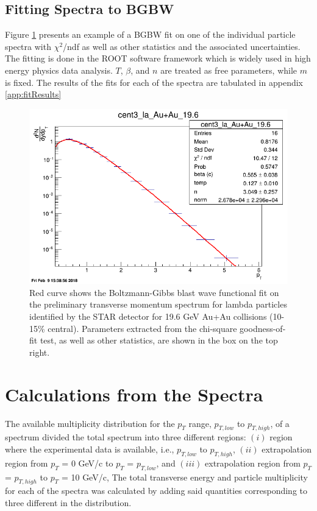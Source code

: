 \subsection{Fitting Spectra to BGBW}
Figure \ref{fig:fit} presents an example of a BGBW fit on one of the individual particle spectra with $\chi^{2}$/ndf as well as other statistics and the associated uncertainties. The fitting is done in the ROOT software framework which is widely used in high energy physics data analysis. $T$, $\beta$, and $n$ are treated as free parameters, while $m$ is fixed. The results of the fits for each of the spectra are tabulated in appendix \ref{app:fitResults}

	\begin{figure}[h]
	  \centering
	  \includegraphics[width=4.5in]{figures/cent3_la_Au+Au_196.png}
	  \caption{Red curve shows the Boltzmann-Gibbs blast wave functional fit on the preliminary transverse momentum spectrum for lambda particles identified by the STAR detector for 19.6 GeV Au+Au collisions (10-15\% central). Parameters extracted from the chi-square goodness-of-fit test, as well as other statistics, are shown in the box on the top right.}\label{fig:fit}
	\end{figure}

\section{Calculations from the Spectra}
The available multiplicity distribution for the $p_{T}$ range, $p_{T,low}$ to $p_{T,high}$, of a spectrum divided the total spectrum into three different regions: $(i)$ region where the experimental data is available, i.e., $p_{T,low}$ to $p_{T,high}$, $(ii)$ extrapolation region from $p_{T}$ = 0 GeV/c to $p_{T}$ = $p_{T,low}$, and $(iii)$ extrapolation region from $p_{T}$ = $p_{T,high}$ to $p_{T}$ = 10 GeV/c,  
The total transverse energy and particle multiplicity for each of the spectra was calculated by adding said quantities corresponding to three different in the distribution.
